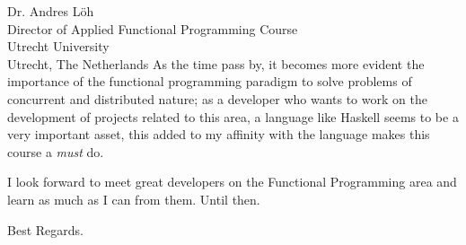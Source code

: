 \documentclass{letter} %
\begin{document}
\begin{letter}{Dr. Andres L\"oh \\
Director of Applied Functional Programming Course \\
Utrecht University \\
Utrecht, The Netherlands}
\noindent As the time pass by, it becomes more evident the importance of the functional programming paradigm 
to solve problems of concurrent and distributed nature; as a developer who wants to work on the development of 
projects related to this area, a language like Haskell seems to be a very important asset, this added to my 
affinity with the language makes this course a \emph{must} do.
 
\noindent I look forward to meet great developers on the Functional Programming area and learn as much as I 
can from them. Until then.

\closing{Best Regards.}

\end{letter}
 
\end{document}

